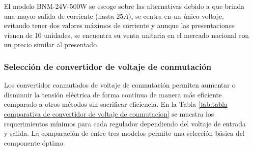 El modelo BNM-24V-500W se escoge sobre las alternativas debido a que brinda una mayor salida de corriente (hasta 25$A$), se centra en un único voltaje, evitando tener dos valores máximos de corriente y aunque las presentaciones vienen de 10 unidades, se encuentra su venta unitaria en el mercado nacional con un precio similar al presentado.

\subsubsection{Selección de convertidor de voltaje de conmutación}

Los convertidor conmutados de voltaje de conmutación permiten aumentar o disminuir la tensión eléctrica de forma continua de manera más eficiente comparado a otros métodos sin sacrificar eficiencia. En la Tabla \ref{tab:tabla comparativa de convertidor de voltaje de conmutacion} se muestra los requerimientos mínimos para cada regulador dependiendo del voltaje de entrada y salida. La comparación de entre tres modelos permite una selección básica del componente óptimo.





